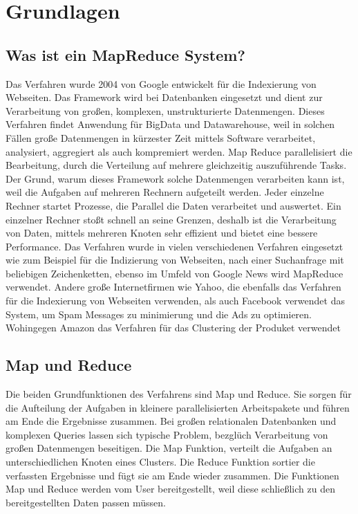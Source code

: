 \documentclass[a4paper,12pt]{article}
\begin{document}
\section{Grundlagen}

\subsection{Was ist ein MapReduce System?}
Das Verfahren wurde 2004 von Google entwickelt für die Indexierung von Webseiten. Das Framework wird bei Datenbanken eingesetzt und dient zur Verarbeitung von großen, komplexen, unstrukturierte Datenmengen.
Dieses Verfahren findet Anwendung für BigData und Datawarehouse, weil in solchen Fällen große Datenmengen in kürzester Zeit mittels Software verarbeitet, analysiert, aggregiert als auch kompremiert werden. 
Map Reduce parallelisiert die Bearbeitung, durch die Verteilung auf mehrere gleichzeitig auszuführende Tasks. Der Grund, warum dieses Framework solche Datenmengen verarbeiten kann ist, weil die Aufgaben auf mehreren Rechnern aufgeteilt werden. Jeder einzelne Rechner startet Prozesse, die Parallel die Daten verarbeitet und auswertet.
Ein einzelner Rechner stoßt schnell an seine Grenzen, deshalb ist die Verarbeitung von Daten, mittels mehreren Knoten sehr effizient und bietet eine bessere Performance.
Das Verfahren wurde in vielen verschiedenen Verfahren eingesetzt wie zum Beispiel für die Indizierung von Webseiten, nach einer Suchanfrage mit beliebigen Zeichenketten, ebenso im Umfeld von Google News wird MapReduce verwendet. Andere große Internetfirmen wie Yahoo, die ebenfalls das Verfahren für die Indexierung von Webseiten verwenden, 
als auch Facebook verwendet das System, um Spam Messages zu minimierung und die Ads zu optimieren. Wohingegen Amazon das Verfahren für das Clustering der Produket verwendet

\subsection{Map und Reduce}
Die beiden Grundfunktionen des Verfahrens sind Map und Reduce. Sie sorgen für die Aufteilung der Aufgaben in kleinere parallelisierten Arbeitspakete und führen am Ende die Ergebnisse zusammen. Bei großen relationalen Datenbanken und komplexen Queries lassen sich typische Problem, bezglüch Verarbeitung von großen Datenmengen beseitigen.
Die Map Funktion, verteilt die Aufgaben an unterschiedlichen Knoten eines Clusters. Die Reduce Funktion sortier die verfassten Ergebnisse und fügt sie am Ende wieder zusammen.
Die Funktionen Map und Reduce werden vom User bereitgestellt, weil diese schließlich zu den bereitgestellten Daten passen müssen.
\newpage
\end{document}
